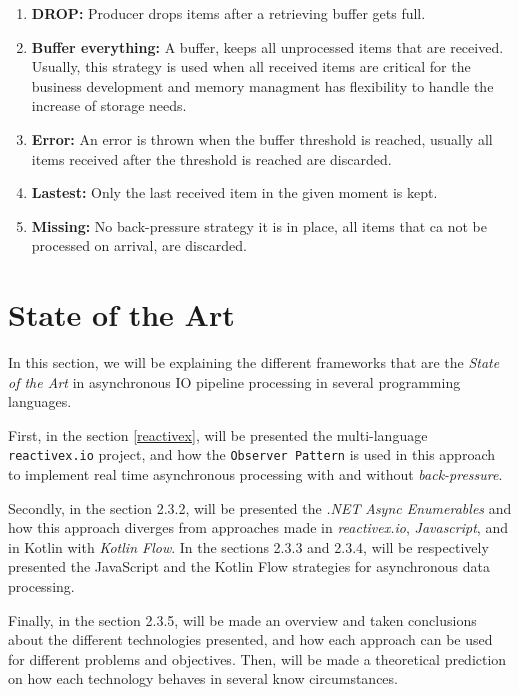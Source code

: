 	\begin{enumerate}
		\item \textbf{DROP:} Producer drops items after a retrieving buffer gets full.
		\item \textbf{Buffer everything:} A buffer, keeps all unprocessed items that are received. Usually, this strategy is used when all received items are critical for the business development and memory managment has flexibility to handle the increase of storage needs.
		\item \textbf{Error:} An error is thrown when the buffer threshold is reached, usually all items received after the threshold is reached are discarded.
		\item \textbf{Lastest:} Only the last received item in the given moment is kept.
		\item \textbf{Missing:} No back-pressure strategy it is in place, all items that ca not be processed on arrival, are discarded.
	\end{enumerate}
	\clearpage

	
\section{State of the Art} %
\label{sec:state_of_the_art}

In this section, we will be explaining the different frameworks that are the \textit{State of the Art} in asynchronous IO pipeline processing in several programming languages.

First, in the section \ref{reactivex}, will be presented the multi-language \texttt{reactivex.io} project, and how the \texttt{Observer Pattern} is used in this approach to implement real time asynchronous processing with and without \textit{back-pressure}.

Secondly, in the section 2.3.2, will be presented the \textit{.NET} \textit{Async Enumerables} and how this approach diverges from approaches made in \textit{reactivex.io}, \textit{Javascript}, and in Kotlin with \textit{Kotlin Flow}.
In the sections 2.3.3 and 2.3.4, will be respectively presented the JavaScript and the Kotlin Flow strategies for asynchronous data processing.

Finally, in the section 2.3.5, will be made an overview and taken conclusions about the different technologies presented, and how each approach can be used for different problems and objectives. Then, will be made a theoretical prediction on how each technology behaves in several know circumstances. 

